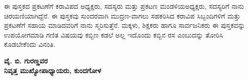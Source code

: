 \medskip
\noindent
ಈ ಪುಸ್ತಕದ ಪ್ರಕಟಣೆಗೆ ಕರಾವಿಪದ ಅಧ್ಯಕ್ಷರು, ಸದಸ್ಯರು ಮತ್ತು ಪ್ರಕಟಣ ಮಂಡಳಿಯ\break ಅಧ್ಯಕ್ಷರು, ಸದಸ್ಯರಿಗೆ ನಾನು ಚಿರಯಣಿಯಾಗಿದ್ದೆನೆ. ಈ ಪುಸ್ತಕವು ಸುಂದರವಾಗಿ ಮುದ್ರಣ-\break ವಾಗಲು ಸಹಕರಿಸಿದ ಕರಾವಿಪ ಸಿಬ್ಬಂದಿಗಳಿಗೆ  ಮತ್ತು ಪ್ರಕಟಣೆಗೆ ಸಹಾಯ ಮಾಡಿದವರಿಗೆ ನಾನು ಸ್ಮರಿಸುತ್ತೆನೆ. ಮಕ್ಕಳು, ಶಿಕ್ಷಕರು ಹಾಗೂ ಸಾರ್ವಜನಿಕರು ಈ ಪುಸ್ತಕವನ್ನು ಉಪಯೋಗಮಾಡಿ ಗಣಿತ ವಿಷಯವು ಕಬ್ಬಿಣ ಕಡಲೆ ಅಲ್ಲ ಇದೊಂದು ಕಬ್ಬಿನ ರಸ ಎಂಬುದನ್ನು ತೋರಿಸಿ ಕೊಡಬೇಕೆಂದು ವಿನಂತಿ. 

\begin{flushright}
{\bf ವೈ. ಬಿ. ಗುರಣ್ಣವರ}\\
{\bf ನಿವೃತ್ತ ಮುಖ್ಯೋಪಾಧ್ಯಾಯರು,  ಕುಂದಗೋಳ}\\
\end{flushright}


